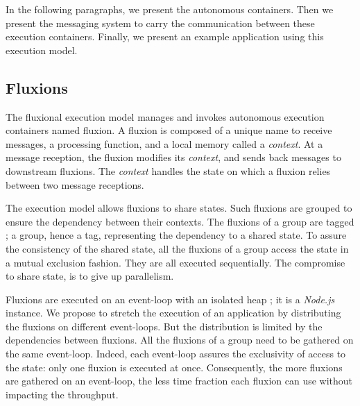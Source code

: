 In the following paragraphs, we present the autonomous containers.
Then we present the messaging system to carry the communication between these execution containers.
Finally, we present an example application using this execution model.

\subsection{Fluxions}

The fluxional execution model manages and invokes autonomous execution containers named fluxion.
A fluxion is composed of a unique name to receive messages, a processing function, and a local memory called a \textit{context}.
At a message reception, the fluxion modifies its \textit{context}, and sends back messages to downstream fluxions.
The \textit{context} handles the state on which a fluxion relies between two message receptions.

The execution model allows fluxions to share states.
Such fluxions are grouped to ensure the dependency between their contexts.
The fluxions of a group are tagged ; a group, hence a tag, representing the dependency to a shared state.
To assure the consistency of the shared state, all the fluxions of a group access the state in a mutual exclusion fashion.
They are all executed sequentially.
The compromise to share state, is to give up parallelism.

Fluxions are executed on an event-loop with an isolated heap ; it is a \textit{Node.js} instance.
We propose to stretch the execution of an application by distributing the fluxions on different event-loops.
But the distribution is limited by the dependencies between fluxions.
All the fluxions of a group need to be gathered on the same event-loop.
Indeed, each event-loop assures the exclusivity of access to the state: only one fluxion is executed at once.
Consequently, the more fluxions are gathered on an event-loop, the less time fraction each fluxion can use without impacting the throughput.



